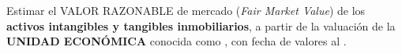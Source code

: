 Estimar el \textcolor{principal}{VALOR RAZONABLE} de mercado (\textit{Fair Market Value}) de los \textcolor{principal}{\textbf{activos intangibles y tangibles inmobiliarios}}, a partir de la valuaci\'on de la \textcolor{principal}{\textbf{UNIDAD ECON\'OMICA}} conocida como \textcolor{principal}{\empresaCorto}, con fecha de valores al \textcolor{principal}{\fechaValores}.